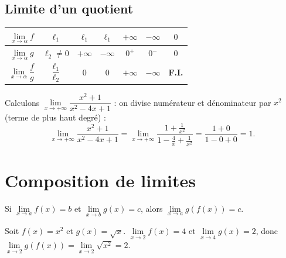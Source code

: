 \documentclass[11pt,a4paper,openany]{book}
\theoremstyle{definition}
\begin{document}
    \subsection{Limite d'un quotient}
    \begin{Propriété}
    \begin{center}
    \renewcommand{\arraystretch}{2}
    \begin{tabular}{|c|c|c|c|c|c|c|}
        \hline
        $\lim\limits_{x\to\alpha}f$ & $\ell_1$ & $\ell_1$ & $\ell_1$ & $+\infty$ & $-\infty$ & $0$ \\
        \hline
        $\lim\limits_{x\to\alpha}g$ & $\ell_2\neq 0$ & $+\infty$ & $-\infty$ & $0^+$ & $0^-$ & $0$ \\
        \hline
        $\lim\limits_{x\to\alpha}\dfrac{f}{g}$ & $\dfrac{\ell_1}{\ell_2}$ & $0$ & $0$ & $+\infty$ & $-\infty$ & \textbf{F.I.} \\
        \hline
    \end{tabular}
    \end{center}
    \end{Propriété}

    \begin{Exemple}
        Calculons $\lim\limits_{x\to+\infty}\dfrac{x^2+1}{x^2-4x+1}$ :
        on divise numérateur et dénominateur par $x^2$ (terme de plus haut degré) :
        \[
            \lim\limits_{x\to+\infty}\frac{x^2+1}{x^2-4x+1}
            = \lim\limits_{x\to+\infty}\frac{1+\frac{1}{x^2}}{1-\frac{4}{x}+\frac{1}{x^2}}
            = \frac{1+0}{1-0+0} = 1.
        \]
    \end{Exemple}

    \section{Composition de limites}
    \begin{Théorème}
        Si $\lim\limits_{x\to a}f(x)=b$ et $\lim\limits_{x\to b}g(x)=c$, alors
        $\lim\limits_{x\to a}g(f(x))=c$.
    \end{Théorème}

    \begin{Exemple}
        Soit $f(x)=x^2$ et $g(x)=\sqrt{x}$.
        $\lim\limits_{x\to 2}f(x)=4$ et $\lim\limits_{x\to 4}g(x)=2$, donc
        $\lim\limits_{x\to 2}g(f(x))=\lim\limits_{x\to 2}\sqrt{x^2}=2$.
    \end{Exemple}
\end{document}
